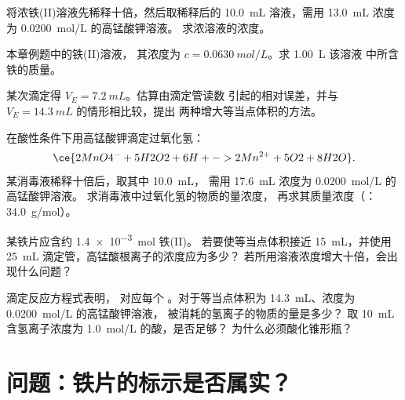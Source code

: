 \begin{exercise}[$\star\star$]\label{exo:g11:titration:10}
将浓铁(II)溶液先稀释十倍，然后取稀释后的
\qty{10.0}{mL} 溶液，需用 \qty{13.0}{mL} 浓度为
\qty{0.0200}{mol/L} 的高锰酸钾溶液。
求浓溶液的浓度。
\end{exercise}

\begin{exercise}[$\star\star$]\label{exo:g11:titration:11}
本章例题中的铁(II)溶液，
其浓度为 $c = \qty{0.0630}{mol/L}$。求 \qty{1.00}{L} 该溶液
中所含铁的质量。
\end{exercise}

\begin{exercise}[$\star\star\star$]\label{exo:g11:titration:12}
某次滴定得 $V_E = \qty{7.2}{mL}$。估算由滴定管读数
引起的相对误差，并与 $V_E = \qty{14.3}{mL}$ 的情形相比较，提出
两种增大等当点体积的方法。
\end{exercise}

\begin{exercise}[$\star\star\star$]\label{exo:g11:titration:13}
在酸性条件下用高锰酸钾滴定过氧化氢：
\[
  \ce{2MnO4^- + 5H2O2 + 6H+ -> 2Mn^{2+} + 5O2 + 8H2O} .
\]
某消毒液稀释十倍后，取其中 \qty{10.0}{mL}，
需用 \qty{17.6}{mL} 浓度为 \qty{0.0200}{mol/L} 的高锰酸钾溶液。
求消毒液中过氧化氢的物质的量浓度，
再求其质量浓度（：\qty{34.0}{g/mol}）。
\end{exercise}

\begin{exercise}[$\star\star\star$]\label{exo:g11:titration:14}
某铁片应含约 \qty{1.4e-3}{mol} 铁(II)。
若要使等当点体积接近
\qty{15}{mL}，并使用 \qty{25}{mL} 滴定管，高锰酸根离子的浓度应为多少？
若所用溶液浓度增大十倍，会出现什么问题？
\end{exercise}

\begin{exercise}[$\star\star\star$]\label{exo:g11:titration:15}
滴定反应方程式表明， 对应每个 。对于等当点体积为
\qty{14.3}{mL}、浓度为 \qty{0.0200}{mol/L} 的高锰酸钾溶液，
被消耗的氢离子的物质的量是多少？
取 \qty{10}{mL} 含氢离子浓度为 \qty{1.0}{mol/L} 的酸，是否足够？
为什么必须酸化锥形瓶？
\end{exercise}

\section{问题：铁片的标示是否属实？}


